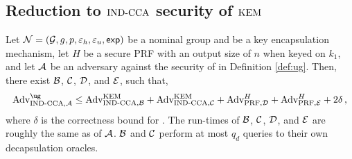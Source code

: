 \subsection{Reduction to $\text{IND-CCA}$ security of $\text{KEM}$}
\label{sec:ug-proofs:cca}

\begin{theorem} \label{theorem:kem-sm}
    Let $\mathcal{N} = (\mathcal{G}, g, p, \varepsilon_h , \varepsilon_u , \textsf{exp})$ be a nominal group and \kem
    be a key encapsulation mechanism, let $H$ be a secure PRF with an output
    size of $n$ when keyed on $k_1$, and let $\mathcal{A}$ be an adversary
    against the \cca security of \ug in Definition \ref{def:ug}.
    Then, there exist $\mathcal{B}$, $\mathcal{C}$, $\mathcal{D}$, and
    $\mathcal{E}$, such that,
    \[
        \advantage{\cca, \adversary{A}}{\ug} \leq \advantage{\cca, \adversary{B}}{\kem} + \advantage{\cca, \adversary{C}}{\kem} + \advantage{\prf, \adversary{D}}{H} + \advantage{\prf, \adversary{E}}{H} + 2\delta \, ,
    \]
    where $\delta$ is the correctness bound for \kem.
    The run-times of $\mathcal{B}$, $\mathcal{C}$, $\mathcal{D}$, and
    $\mathcal{E}$ are roughly the same as of $\mathcal{A}$.
    $\mathcal{B}$ and $\mathcal{C}$ perform at most $q_d$ queries to
    their own decapsulation oracles.
\end{theorem}


